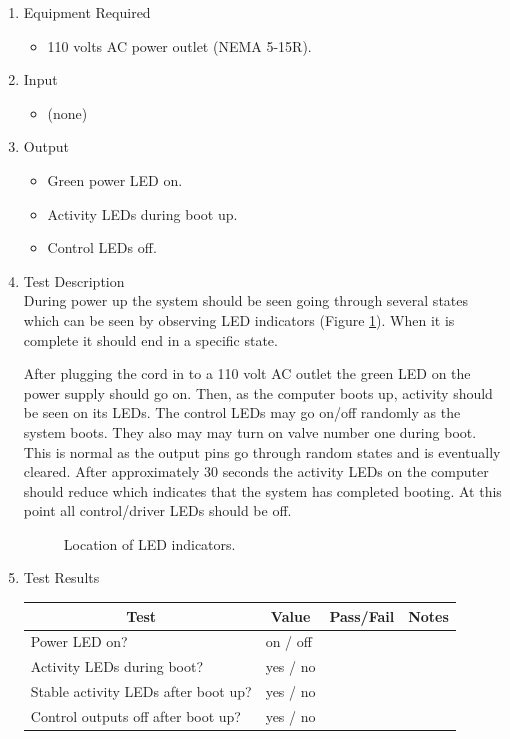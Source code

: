 \documentclass{article}
\begin{document}
\begin{enumerate}
\item Equipment Required
	\begin{itemize}
		\item 110 volts AC power outlet (NEMA 5-15R).
	\end{itemize}
\item Input
	\begin{itemize}
	\item (none)
	\end{itemize}
\item Output
	\begin{itemize}
	\item Green power LED on.
	\item Activity LEDs during boot up.
	\item Control LEDs off.
	\end{itemize}
\item Test Description \\

During power up the system should be seen going through several states
which can be seen by observing LED indicators (Figure \ref{fig:ledind}).
When it is complete it should end in a specific state.

After plugging the cord in to a 110 volt AC outlet the green LED on
the power supply should go on.
Then, as the computer boots up, activity should be seen on its LEDs.
The control LEDs may go on/off randomly as the system boots.
They also may may turn on valve number one during boot.
This is normal as the output pins go through random states and
is eventually cleared.
After approximately 30 seconds the activity LEDs on the computer
should reduce which indicates that the system has completed booting.
At this point all control/driver LEDs should be off.

\begin{figure}[hbp!]
\caption{Location of LED indicators.}\label{fig:ledind}
\end{figure}

\pagebreak
\item Test Results \\
\vspace{1em}
\begin{tabular}{|l|l|l|l|}
	\hline
	\multicolumn{1}{|c|}{Test}
	& \multicolumn{1}{|c|}{Value}
	& \multicolumn{1}{|c|}{Pass/Fail}
	& \multicolumn{1}{|c|}{Notes} \\
	\hline
	Power LED on? & on / off && \hspace{1.7in} \\
	\hline
	Activity LEDs during boot? & yes / no && \\
	\hline
	Stable activity LEDs after boot up? & yes / no && \\
	\hline
	Control outputs off after boot up? & yes / no && \\
	\hline
\end{tabular}

\end{enumerate}
\end{document}
